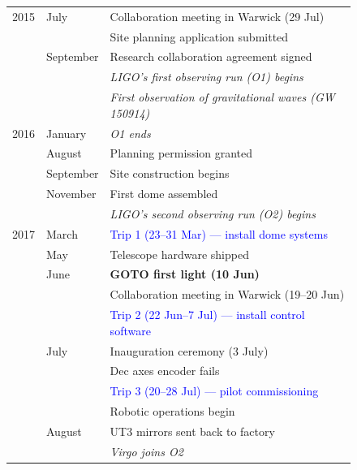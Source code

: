 \begin{colsection}
\begin{colsection}
\begin{figure}[p]
    \begin{center}
        \begin{tabular}{cl|@{\tls}l} %
            2015 & July      & Collaboration meeting in Warwick (29 Jul) \\
                 &           & Site planning application submitted \\
                 & September & Research collaboration agreement signed \\
                 &           & \textit{LIGO's first observing run (O1) begins} \\
                 &           & \textit{First observation of gravitational waves (GW 150914)} \\
            \midrule
            2016 & January   & \textit{O1 ends} \\
                 & August    & Planning permission granted \\
                 & September & Site construction begins \\
                 & November  & First dome assembled \\
                 &           & \textit{LIGO's second observing run (O2) begins} \\
            \midrule
            2017 & March     & \textcolor{Blue}{Trip 1 (23--31 Mar) --- install dome systems} \\
                 & May       & Telescope hardware shipped \\
                 & June      & \textbf{GOTO first light (10 Jun)} \\
                 &           & Collaboration meeting in Warwick (19--20 Jun) \\
                 &           & \textcolor{Blue}{Trip 2 (22 Jun--7 Jul) --- install control software} \\
                 & July      & Inauguration ceremony (3 July) \\
                 &           & Dec axes encoder fails \\
                 &           & \textcolor{Blue}{Trip 3 (20--28 Jul) --- pilot commissioning} \\
                 &           & Robotic operations begin \\
                 & August    & UT3 mirrors sent back to factory \\
                 &           & \textit{Virgo joins O2} \\

\end{tabular}
\end{center}
\end{figure}
\end{colsection}
\end{colsection}
